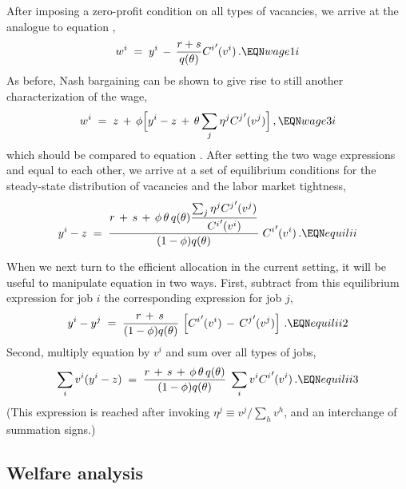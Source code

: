 After imposing a zero-profit condition on all types of vacancies,
we arrive at the analogue to equation ,
$$
w^i\;=\; y^i \,-\, {r+s \over q(\theta)} {C^i}'(v^i) \,.         \EQN wage1i
$$
As before, Nash bargaining can be shown to give rise to still another
characterization of the wage,
$$
w^i\;=\; z \,+\, \phi\Bigl[y^i-z\,+\,\theta
                \sum_j \eta^j {C^j}'(v^j)  \Bigr]\,,    \EQN wage3i
$$
which should be compared to equation . After
setting the two wage expressions  and  equal to
each other, we arrive at a set of equilibrium conditions for
the steady-state distribution of vacancies and
the labor market tightness,
$$
y^i-z \;=\; {\displaystyle r\,+\,s\,+\,\phi\,\theta\,q(\theta)
              {\sum\nolimits_j \eta^j {C^j}'(v^j)
              \over  {C^i}'(v^i) }
             \over \displaystyle  (1-\phi) q(\theta) } \; {C^i}'(v^i) \,.
                                                           \EQN equilii
$$


When we next turn to the efficient allocation in the current setting,
it will be useful to manipulate equation 
in two ways. First, subtract from this equilibrium expression for job $i$
the corresponding expression for job $j$,
$$
y^i-y^j \;=\; {r\,+\,s\, \over  (1-\phi) q(\theta) } \,
            \left[ {C^i}'(v^i) \,-\,  {C^j}'(v^j) \right] \,.   \EQN equilii2
$$
Second, multiply equation  by $v^i$ and sum over all types of
jobs,
$$
\sum_i v^i (y^i-z) \;=\; {r\,+\,s\,+\,\phi\,\theta\,q(\theta)  \over
      (1-\phi) q(\theta) } \; \sum_i v^i {C^i}'(v^i) \,. \EQN equilii3
$$ (This expression is reached after invoking $\eta^j \equiv v^j / \sum_h v^h$, and an interchange of summation signs.)


\subsection{Welfare analysis}

